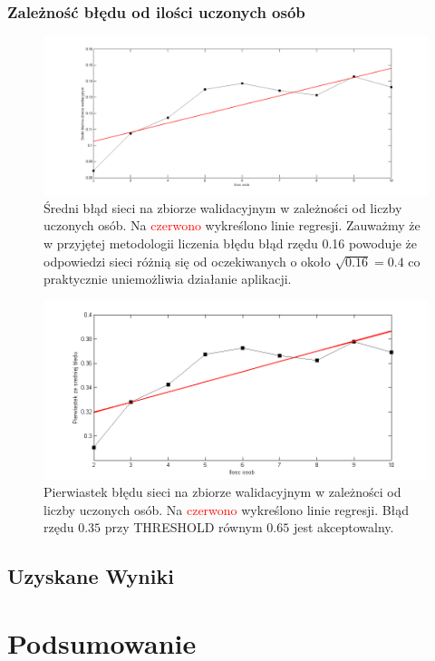 \documentclass[a4paper]{article}
\begin{document}
		\subsubsection*{Zależność błędu od ilości uczonych osób}	
			\begin{figure}[h]
				\centering
				\includegraphics[width=\textwidth,trim= 3cm 0cm 3cm 0cm, clip]{./img/b_od_lo}
				\caption{Średni błąd sieci na zbiorze walidacyjnym w zależności od liczby uczonych osób.
				Na \textcolor{red}{czerwono} wykreślono linie regresji. Zauważmy że w przyjętej metodologii
				liczenia błędu błąd rzędu 0.16 powoduje że odpowiedzi sieci różnią się od oczekiwanych
				o około $\sqrt{0.16} = 0.4$ co praktycznie uniemożliwia działanie aplikacji.}
				\label{fig:bodilos}
			\end{figure}
			\begin{figure}[h]
				\centering
				\includegraphics[width=\textwidth,trim= 1cm 0cm 1cm 0cm, clip]{./img/b_od_lo2}
				\caption{Pierwiastek błędu sieci na zbiorze walidacyjnym w zależności od liczby uczonych osób.
				Na \textcolor{red}{czerwono} wykreślono linie regresji. Błąd rzędu $0.35$ przy THRESHOLD równym
				$0.65$ jest akceptowalny.}
				\label{fig:bodilosd}
			\end{figure}
	\subsection{Uzyskane Wyniki}
\section{Podsumowanie}
\end{document}
